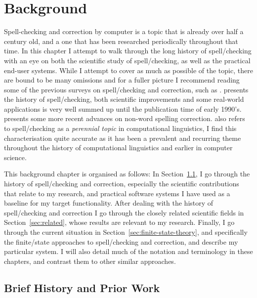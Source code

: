 \documentclass[officiallayout]{unihelcompling}
\begin{document}
\chapter{Background}
\label{chap:background}

Spell-checking and correction by computer is a topic that is already over half
a century old, and a one that has been researched periodically throughout that
time.  In this chapter I attempt to walk through the long history of
spell\-/checking with an eye on both the scientific study of spell\-/checking,
as well as the practical end-user systems. While I attempt to cover as
much as possible of the topic, there are bound to be many omissions and for
a fuller picture I recommend reading some of the previous surveys on
spell\-/checking and correction, such as
\citet{kukich1992spelling,mitton2009ordering}.  \citet{kukich1992spelling}
presents
the history of spell\-/checking, both scientific improvements and some
real-world applications is very well summed up until the publication time of
early 1990's.  \citet{mitton2009ordering} presents some more recent advances on
non-word spelling correction.  \citet{kukich1992spelling} also refers to
spell\-/checking as a \emph{perennial topic} in computational linguistics, I
find this characterisation quite accurate as it has been a prevalent and
recurring theme throughout the history of computational linguistics and earlier
in computer science.


This background chapter is organised as follows: In
Section~\ref{sec:history}, I go through the history of spell\-/checking and
correction, especially the scientific contributions that relate to my research,
and practical software systems I have used as a baseline for my target
functionality.  After dealing with the history of spell\-/checking and
correction I go through the closely related scientific fields in
Section~\ref{sec:related}, whose results are relevant to my research. Finally,
I go through the current situation in Section~\ref{sec:finite-state-theory},
and specifically the finite\-/state approaches to spell\-/checking and
correction, and describe my particular system. I will also detail much of the
notation and terminology in these chapters, and contrast them to other similar
approaches.

\section{Brief History and Prior Work}
\label{sec:history}
\end{document}
